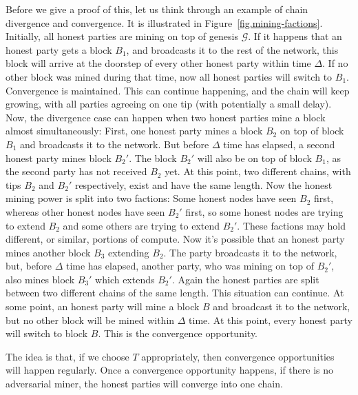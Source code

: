 Before we give a proof of this, let us think through an example of chain divergence and convergence.
It is illustrated in Figure~\ref{fig.mining-factions}.
Initially, all honest parties are mining on top of genesis $\mathcal{G}$. If it happens that an honest party
gets a block $B_1$, and broadcasts it to the rest of the network, this block will arrive at the doorstep of every other honest
party within time $\Delta$. If no other block was mined during that time, now all honest parties will
switch to $B_1$. Convergence is maintained. This can continue happening, and the chain will
keep growing, with all parties agreeing on one tip (with potentially a small delay). Now, the divergence
case can happen when two honest parties mine a block almost simultaneously: First, one honest party
mines a block $B_2$ on top of block $B_1$ and broadcasts it to the network. But before $\Delta$ time has
elapsed, a second honest party mines block $B_2'$. The block $B_2'$ will also be on top of block $B_1$,
as the second party has not received $B_2$ yet. At this point, two different chains, with tips $B_2$
and $B_2'$ respectively, exist and have the same length. Now the honest mining power is split into
two factions: Some honest nodes have seen $B_2$ first, whereas other honest nodes have seen $B_2'$
first, so some honest nodes are trying to extend $B_2$ and some others are trying to extend $B_2'$.
These factions may hold different, or similar, portions of compute. Now it's possible that an
honest party mines another block $B_3$ extending $B_2$. The party broadcasts it to the network,
but, before $\Delta$ time has elapsed, another party, who was mining on top of $B_2'$, also mines
block $B_3'$ which extends $B_2'$. Again the honest parties are split between two different chains
of the same length. This situation can continue. At some point, an honest party will mine a block
$B$ and broadcast it to the network, but no other block will be mined within $\Delta$ time. At
this point, every honest party will switch to block $B$. This is the convergence opportunity.

The idea is that, if we choose $T$ appropriately, then convergence opportunities will happen regularly.
Once a convergence opportunity happens, if there is no adversarial miner, the honest parties will converge into
one chain.

